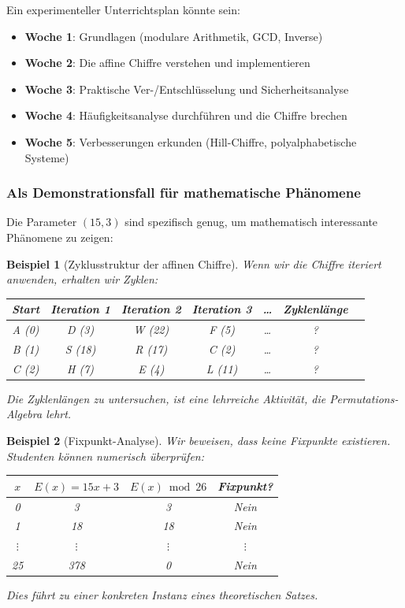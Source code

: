 ﻿\documentclass[12pt,a4paper]{article}
\newtheorem{example}{Beispiel}
\begin{document}
	Ein experimenteller Unterrichtsplan könnte sein:
	\begin{itemize}
		\item \textbf{Woche 1}: Grundlagen (modulare Arithmetik, GCD, Inverse)
		\item \textbf{Woche 2}: Die affine Chiffre verstehen und implementieren
		\item \textbf{Woche 3}: Praktische Ver-/Entschlüsselung und Sicherheitsanalyse
		\item \textbf{Woche 4}: Häufigkeitsanalyse durchführen und die Chiffre brechen
		\item \textbf{Woche 5}: Verbesserungen erkunden (Hill-Chiffre, polyalphabetische Systeme)
	\end{itemize}
	
	\subsubsection{Als Demonstrationsfall für mathematische Phänomene}
	
	Die Parameter $(15, 3)$ sind spezifisch genug, um mathematisch interessante Phänomene zu zeigen:
	
	\begin{example}[Zyklusstruktur der affinen Chiffre]
		Wenn wir die Chiffre iteriert anwenden, erhalten wir Zyklen:
		
		\begin{center}
			\small
			\begin{tabular}{|c|c|c|c|c|c|c|}
				\hline
				Start & Iteration 1 & Iteration 2 & Iteration 3 & \ldots & Zyklenlänge \\
				\hline
				A (0) & D (3) & W (22) & F (5) & \ldots & ? \\
				B (1) & S (18) & R (17) & C (2) & \ldots & ? \\
				C (2) & H (7) & E (4) & L (11) & \ldots & ? \\
				\hline
			\end{tabular}
		\end{center}
		
		Die Zyklenlängen zu untersuchen, ist eine lehrreiche Aktivität, die Permutations-Algebra lehrt.
	\end{example}
	
	\begin{example}[Fixpunkt-Analyse]
		Wir beweisen, dass keine Fixpunkte existieren. Studenten können numerisch überprüfen:
		\begin{center}
			\small
			\begin{tabular}{|c|c|c|c|}
				\hline
				$x$ & $E(x) = 15x + 3$ & $E(x) \bmod 26$ & Fixpunkt? \\
				\hline
				0 & 3 & 3 & Nein \\
				1 & 18 & 18 & Nein \\
				$\vdots$ & $\vdots$ & $\vdots$ & $\vdots$ \\
				25 & 378 & 0 & Nein \\
				\hline
			\end{tabular}
		\end{center}
		
		Dies führt zu einer konkreten Instanz eines theoretischen Satzes.
	\end{example}
	
\end{document}
